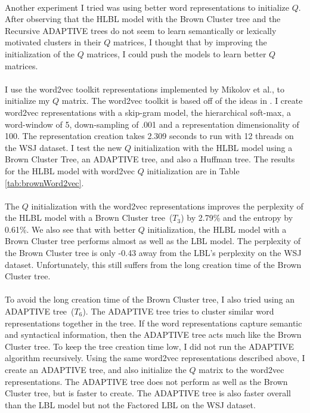 \paragraph{}
Another experiment I tried was using better word representations to initialize $Q$. After observing that the HLBL model with the Brown Cluster tree and the Recursive ADAPTIVE trees do not seem to learn semantically or lexically motivated clusters in their $Q$ matrices, I thought that by improving the initialization of the $Q$ matrices, I could push the models to learn better $Q$ matrices. 
\paragraph{}
I use the word2vec toolkit representations implemented by Mikolov et al., to initialize my $Q$ matrix. The word2vec toolkit is based off of the ideas in \cite{Mikolov2013}. I create word2vec representations with a skip-gram model, the hierarchical soft-max, a word-window of 5, down-sampling of .001 and a representation dimensionality of 100. The representation creation takes 2.309 seconds to run with 12 threads on the WSJ dataset.  I test the new $Q$ initialization with the HLBL model using a Brown Cluster Tree, an ADAPTIVE tree, and also a Huffman tree. The results for the HLBL model with word2vec $Q$ initialization are in Table \ref{tab:brownWord2vec}.

\paragraph{}
The $Q$ initialization with the word2vec representations improves the perplexity of the HLBL model with a Brown Cluster tree~($T_3$) by 2.79\% and the entropy by 0.61\%. We also see that with better $Q$ initialization, the HLBL model with a Brown Cluster tree performs almost as well as the LBL model. The perplexity of the Brown Cluster tree is only -0.43 away from the LBL's perplexity on the WSJ dataset. Unfortunately, this still suffers from the long creation time of the Brown Cluster tree.
\paragraph{}
To avoid the long creation time of the Brown Cluster tree, I also tried using an ADAPTIVE tree~($T_6$). The ADAPTIVE tree tries to cluster similar word representations together in the tree. If the word representations capture semantic and syntactical information, then the ADAPTIVE tree acts much like the Brown Cluster tree. To keep the tree creation time low, I did not run the ADAPTIVE algorithm recursively. Using the same word2vec representations described above, I create an ADAPTIVE tree, and also initialize the $Q$ matrix to the word2vec representations. The ADAPTIVE tree does not perform as well as the Brown Cluster tree, but is faster to create. The ADAPTIVE tree is also faster overall than the LBL model but not the Factored LBL on the WSJ dataset.

